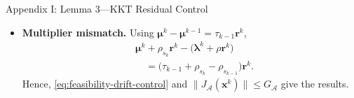 \documentclass[handout,compress,9pt]{beamer}
\newcommand{\blue}[1]{\textcolor{ddlblue}{#1}}
\newcommand{\bx}{\bm{x}}
\newcommand{\br}{\bm{r}}
\newcommand{\bmu}{\bm{\mu}}
\newcommand{\blmbd}{\bm{\lambda}}
\newcommand{\calA}{\mathcal{A}}
\begin{document}
\begin{frame}{Appendix I: Lemma 3---KKT Residual Control
\hfill\hyperlink{appendix:contents}{}}
\begin{itemize}
\item[\blue{$\triangleright$}]
\textbf{Multiplier mismatch.}
Using $\bmu^k-\bmu^{k-1}=\tau_{k-1}\br^k$,
\begin{equation*}
\begin{aligned}
  &\bmu^k+\rho_{s_k}\br^k
  -\bigl(\blmbd^k+\rho\br^k\bigr)\\
  &\quad=\bigl(\tau_{k-1}
  +\rho_{s_k}-\rho_{s_{k-1}}\bigr)\br^k.
\end{aligned}
\end{equation*}
Hence, \eqref{eq:feasibility-drift-control} and
$\|J_{\calA}(\bx^k)\|\le G_{\calA}$ give the results.
\end{itemize}
\end{frame}
\end{document}
